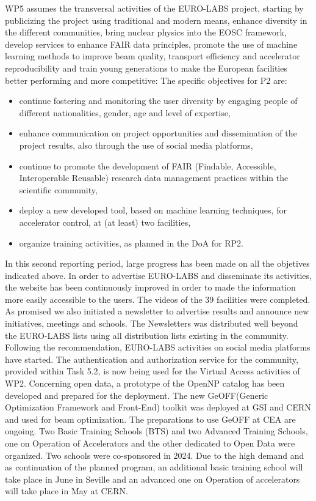  WP5 assumes the transversal activities of the EURO-LABS project, starting by publicizing the project using traditional and modern means, enhance diversity in the different communities, bring nuclear physics into the EOSC framework, develop services to enhance FAIR data principles, promote the use of machine learning methods  to improve beam quality, transport efficiency and accelerator reproducibility and train young generations to make the European facilities better performing and more competitive: The specific objectives for P2 are: 
\begin{itemize}
    \item continue fostering and monitoring the user diversity by engaging people of different nationalities, gender, age and level of expertise,
    \item enhance communication on project opportunities and dissemination of the project results, also through the use of social media platforms,
    \item continue to promote the development of FAIR (Findable, Accessible, Interoperable Reusable) research data management practices within the scientific community,
    \item deploy a  new developed tool, based on machine learning techniques, for accelerator control, at (at least) two facilities,
    \item organize training activities, as planned in the DoA for RP2.
\end{itemize}
In this second reporting period, large progress has been made on all the objetives indicated above. In order to advertise EURO-LABS and disseminate its activities, the website has been continuously improved in order to made the information more easily accessible to the users.  
The videos of the  39 facilities were completed. 
As promised we also initiated a newsletter to advertise results and announce new initiatives, meetings and schools. The Newsletters was distributed well beyond the EURO-LABS lists using all distribution lists existing in the community. Following the recommendation, EURO-LABS activities on social media platforms have started.
The authentication and authorization service for the community, provided within Task 5.2, is now being used for the Virtual Access activities of WP2. Concerning open data, a prototype of the OpenNP catalog 
has been developed and prepared for the deployment. The new GeOFF(Generic Optimization Framework
and Front-End) toolkit was deployed at GSI and CERN and used for beam optimization. The preparations to use GeOFF at CEA are ongoing.
Two Basic Training Schools (BTS) and two Advanced Training Schools, one on Operation
of Accelerators and the other dedicated to Open Data were organized.
Two schools were co-sponsored in 2024. Due to the high demand and as continuation of the planned program, an additional basic training school will take place in June in Seville and an advanced one on Operation of accelerators will take place in May at CERN.

